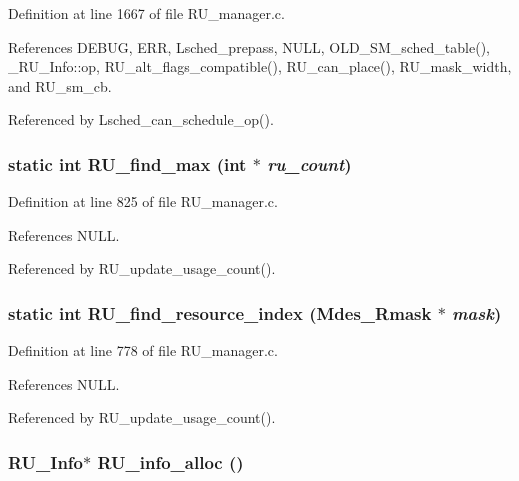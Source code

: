 Definition at line 1667 of file RU\_\-manager.c.

References DEBUG, ERR, Lsched\_\-prepass, NULL, OLD\_\-SM\_\-sched\_\-table(), \_\-RU\_\-Info::op, RU\_\-alt\_\-flags\_\-compatible(), RU\_\-can\_\-place(), RU\_\-mask\_\-width, and RU\_\-sm\_\-cb.

Referenced by Lsched\_\-can\_\-schedule\_\-op().
\subsubsection{\setlength{\rightskip}{0pt plus 5cm}static int RU\_\-find\_\-max (int $\ast$ {\em ru\_\-count})\hspace{0.3cm}{\tt  [static]}}\label{RU__manager_8c_865b549327e21580cf97523f09713419}




Definition at line 825 of file RU\_\-manager.c.

References NULL.

Referenced by RU\_\-update\_\-usage\_\-count().
\subsubsection{\setlength{\rightskip}{0pt plus 5cm}static int RU\_\-find\_\-resource\_\-index (Mdes\_\-Rmask $\ast$ {\em mask})\hspace{0.3cm}{\tt  [static]}}\label{RU__manager_8c_eb113fdbde35088a445fb114cb393d4a}




Definition at line 778 of file RU\_\-manager.c.

References NULL.

Referenced by RU\_\-update\_\-usage\_\-count().
\subsubsection{\setlength{\rightskip}{0pt plus 5cm}\bf{RU\_\-Info}$\ast$ RU\_\-info\_\-alloc ()}\label{RU__manager_8c_e25d4f480fef627b2aa2c3c0f0dd7f6a}




